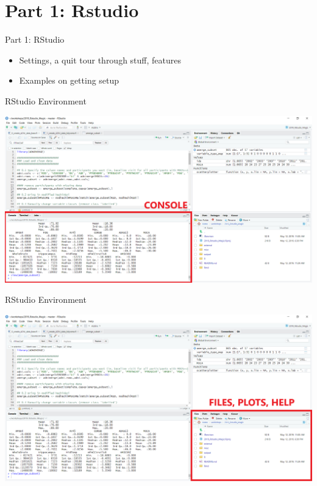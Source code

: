 \documentclass[ignorenonframetext,]{beamer}
\providecommand{\tightlist}{%
  \setlength{\itemsep}{0pt}\setlength{\parskip}{0pt}}
\begin{document}
\hypertarget{part-1-rstudio}{%
\section{Part 1: Rstudio}\label{part-1-rstudio}}

\begin{frame}{Part 1: RStudio}
\protect\hypertarget{part-1-rstudio-1}{}

\begin{itemize}
\tightlist
\item
  Settings, a quit tour through stuff, features
\item
  Examples on getting setup
\end{itemize}

\end{frame}

\begin{frame}{RStudio Environment}
\protect\hypertarget{rstudio-environment}{}

\includegraphics{../external/images/rstudio_terminal_1_CONSOLE.png}

\end{frame}

\begin{frame}{RStudio Environment}
\protect\hypertarget{rstudio-environment-1}{}

\includegraphics{../external/images/rstudio_terminal_2_FILES.png}

\end{frame}
\end{document}
